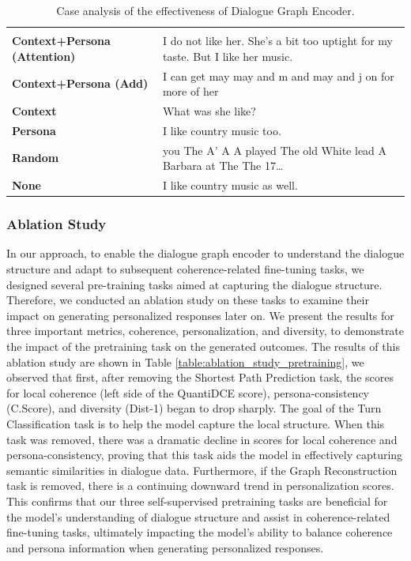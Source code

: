 \documentclass[letterpaper]{article} %
\begin{document}
\begin{table}[ht]
\begin{tabular}{|p{3.5cm}|p{12cm}|}
\hhline{|==|}
\rowcolor[RGB]{204,217,245}
\multicolumn{2}{|c|}{\textbf{Response}} \\
\hhline{|==|}
\textbf{Context+Persona (Attention)} & I do not like her. She's a bit too uptight for my taste. But I like her music. \\
\textbf{Context+Persona (Add)} & I can get may may and m and may and j on for more of her \\
\textbf{Context} &  What was she like? \\
\textbf{Persona} & I like country music too. \\
\textbf{Random} & you The A’ A A played The old White lead A Barbara at The The 17… \\
\textbf{None} & I like country music as well. \\

\hline
\end{tabular}
\caption{Case analysis of the effectiveness of Dialogue Graph Encoder.}
\label{table:case_study_effectiveness_of_dialogue_graph_encoder}
\end{table}

\subsubsection{Ablation Study}
In our approach, to enable the dialogue graph encoder to understand the dialogue structure and adapt to subsequent coherence-related fine-tuning tasks, we designed several pre-training tasks aimed at capturing the dialogue structure. Therefore, we conducted an ablation study on these tasks to examine their impact on generating personalized responses later on. We present the results for three important metrics, coherence, personalization, and diversity, to demonstrate the impact of the pretraining task on the generated outcomes.
The results of this ablation study are shown in Table \ref{table:ablation_study_pretraining}, we observed that first, after removing the Shortest Path Prediction task, the scores for local coherence (left side of the QuantiDCE score), persona-consistency (C.Score), and diversity (Dist-1) began to drop sharply. The goal of the Turn Classification task is to help the model capture the local structure. When this task was removed, there was a dramatic decline in scores for local coherence and persona-consistency, proving that this task aids the model in effectively capturing semantic similarities in dialogue data. Furthermore, if the Graph Reconstruction task is removed, there is a continuing downward trend in personalization scores. This confirms that our three self-supervised pretraining tasks are beneficial for the model’s understanding of dialogue structure and assist in coherence-related fine-tuning tasks, ultimately impacting the model's ability to balance coherence and persona information when generating personalized responses.
\end{document}
